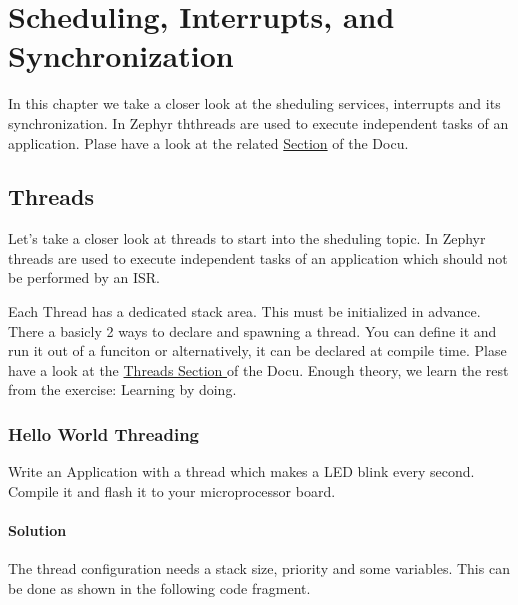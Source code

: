 \chapter{Scheduling, Interrupts, and Synchronization}

In this chapter we take a closer look at the sheduling services, interrupts and its synchronization. In Zephyr ththreads are used to execute independent tasks of an application. Plase have a look at the related \href{https://docs.zephyrproject.org/latest/reference/kernel/index.html#scheduling-interrupts-and-synchronization}{Section} of the \Zephyr Docu. 


\section{Threads}
Let's take a closer look at threads to start into the sheduling topic. In Zephyr threads are used to execute independent tasks of an application which should not be performed by an ISR. 

Each Thread has a dedicated stack area. This must be initialized in advance. There a basicly 2 ways to declare and spawning a thread. You can define it and run it out of a funciton or alternatively, it can be declared at compile time. 
Plase have a look at the \href{https://docs.zephyrproject.org/latest/reference/kernel/threads/index.html}{Threads Section }of the \Zephyr Docu. 
Enough theory, we learn the rest from the exercise: Learning by doing.


\subsection{Hello World Threading}

\begin{exercise}
Write an Application with a thread which makes a LED blink every second. Compile it and flash it to your microprocessor board. 
\end{exercise}

\subsubsection{Solution}

The thread configuration needs a stack size, priority and some variables. This can be done as shown in the following code fragment. 

\inputminted[firstline=30, lastline=36, linenos, bgcolor=lightgray, fontsize=\scriptsize]{c}{../samples/helloWorldThreadingStep0/src/main.c}

